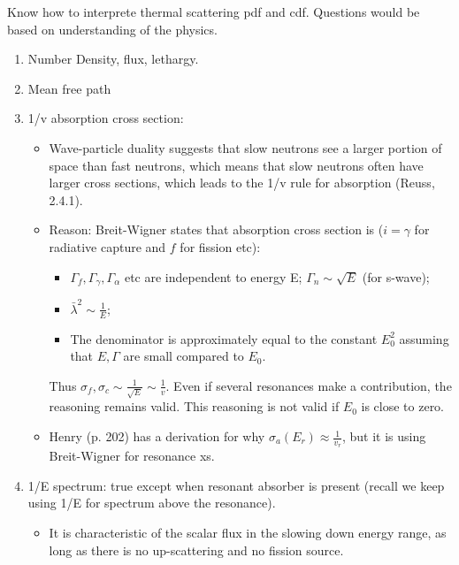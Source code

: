 \documentclass{school-22.211-notes}
\date{March 14, 2012}
\begin{document}
\maketitle

Know how to interprete thermal scattering pdf and cdf. Questions would be based on understanding of the physics. 
\begin{enumerate}
\item Number Density, flux, lethargy.  
\item Mean free path
\item 1/v absorption cross section: 
  \begin{itemize}
  \item Wave-particle duality suggests that slow neutrons see a larger portion of space than fast neutrons, which means that slow neutrons often have larger cross sections, which leads to the 1/v rule for absorption (Reuss, 2.4.1). 
  \item Reason: Breit-Wigner states that absorption cross section is ($i = \gamma$ for radiative capture and $f$ for fission etc):
    \begin{itemize}
    \item $\Gamma_f, \Gamma_{\gamma}, \Gamma_{\alpha}$ etc are independent to energy E; $\Gamma_n \sim \sqrt{E}$ (for s-wave);
    \item $\bar{\lambda}^2 \sim \frac{1}{E}$;
    \item The denominator is approximately equal to the constant $E_0^2$ assuming that $E, \Gamma$ are small compared to $E_0$.
    \end{itemize}
    Thus $\sigma_f, \sigma_c \sim \frac{1}{\sqrt{E}} \sim \frac{1}{v}$. Even if several resonances make a contribution, the reasoning remains valid. This reasoning is not valid if $E_0$ is close to zero. 
  \item Henry (p. 202) has a derivation for why $\sigma_a(E_r) \approx \frac{1}{v_r}$, but it is using Breit-Wigner for resonance xs. 
  \end{itemize}
\item 1/E spectrum: true except when resonant absorber is present (recall we keep using 1/E for spectrum above the resonance). 
  \begin{itemize}
  \item It is characteristic of the scalar flux in the slowing down energy range, as long as there is no up-scattering and no fission source. 

\end{itemize}
\end{enumerate}
\end{document}
